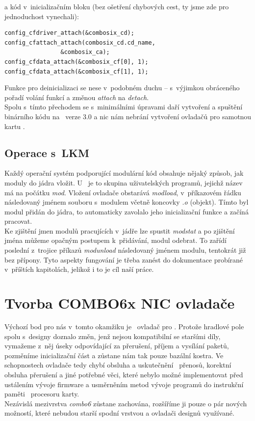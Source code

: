   a kód v~inicializačním bloku (bez ošetření chybových cest, ty jsme zde pro
  jednoduchost vynechali):
\begin{verbatim}
config_cfdriver_attach(&combosix_cd);
config_cfattach_attach(combosix_cd.cd_name,
                &combosix_ca);
config_cfdata_attach(&combosix_cf[0], 1);
config_cfdata_attach(&combosix_cf[1], 1);
\end{verbatim}
  Funkce pro deinicializaci se nese v~podobném duchu -- s~výjimkou
  obráceného pořadí volání funkcí a změnou \emph{attach} na
  \emph{detach}. \\ \indent
  Spolu s~tímto přechodem se s~minimálními úpravami daří vytvoření a spuštění
  binárního kódu na \nbsd\ verze 3.0 a nic nám nebrání vytvoření ovladačů pro
  samotnou kartu \comx.
  \subsection{Operace s~LKM}
  Každý operační systém podporující modulární kód obsahuje nějaký způsob,
  jak moduly do jádra vložit. U \nbsd\ je to skupina uživatelských
  programů, jejichž název má na počátku \emph{mod}. Vložení ovladače obstarává
  \emph{modload}, v~příkazovém řádku následovaný jménem souboru s~modulem
  včetně koncovky
  \emph{.o} (objekt). Tímto byl modul přidán do jádra, to automaticky zavolalo
  jeho inicializační funkce a začíná pracovat. \\ \indent
  Ke zjištění jmen modulů pracujících v~jádře lze spustit \emph{modstat} a po
  zjištění jména můžeme opačným postupem k~přidávání, modul odebrat. To
  zařídí poslední z~trojice příkazů \emph{modunload} následovaný jménem
  modulu, tentokrát již bez přípony. Tyto aspekty fungování je třeba zanést do
  dokumentace probírané v~příštích kapitolách, jelikož i to je cíl naší práce.
  \section{Tvorba COMBO6x NIC ovladače}
  Výchozí bod pro nás v~tomto okamžiku je \nic\ ovladač pro \com.
  Protože hradlové pole spolu s~designy doznalo změn, jenž nejsou kompatibilní
  se staršími díly, vymažeme z~něj úseky odpovídající za přerušení, příjem a
  vysílání paketů, pozměníme inicializační část a zůstane nám tak pouze
  bazální kostra. Ve schopnostech ovladače tedy chybí obsluha a
  uskutečnění \dma\ přenosů, korektní obsluha přerušení a jiné potřebné věci,
  které nebylo možné implementovat před ustálením vývoje
  firmware a usměrněním metod vývoje programů do instrukční paměti \ppc\
  procesoru karty. \\ \indent
  Nezávislá mezivrstva \emph{combo6} zůstane zachována, rozšíříme ji pouze o
  pár nových možností, které nebudou starší spodní vrstvou a ovladači designů
  využívané.
